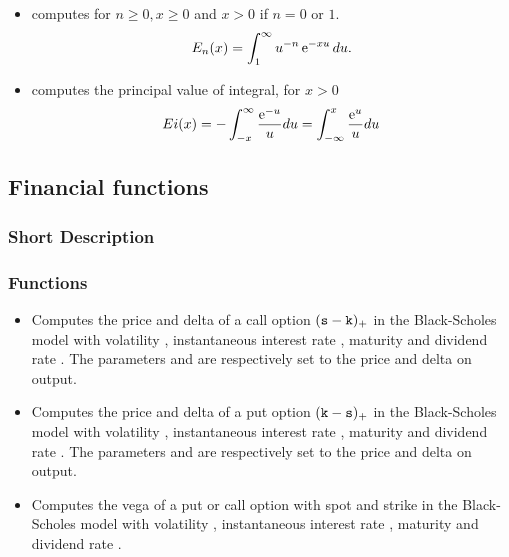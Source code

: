 \begin{itemize}
\item {}
  \sshortdescribe   computes for  $ n\geq 0, x \geq 0$ and $x>0$ if $n=0$ or $1$.
  \begin{equation*}
    E_n(x)= \int_1^{\infty} u^{-n} \operatorname{e}^{ -x u } du.
  \end{equation*}
\item {}
  \sshortdescribe   computes the principal value of integral, for $x>0$ 
  \begin{equation*}
    Ei(x) = - \int_{-x}^{\infty} \frac{\operatorname{e}^{ -u }}{u} du = \int_{-\infty}^x \frac{\operatorname{e}^{ u }}{u} du 
  \end{equation*}
\end{itemize}




\subsection{Financial functions}
\subsubsection{Short Description}
\subsubsection{Functions}


\begin{itemize}
\item
  \sshortdescribe Computes the price and delta of a call option $({\tt s} -
  {\tt k})_+$ in the Black-Scholes model with volatility ,
  instantaneous interest rate , maturity  and dividend rate
  . The parameters  and  are respectively
  set to the price and delta on output.
\item
  \sshortdescribe Computes the price and delta of a put option $({\tt k} - 
  {\tt s})_+$ in the Black-Scholes model with volatility ,
  instantaneous interest rate , maturity  and dividend rate
  .  The parameters  and  are respectively
  set to the price and delta on output.
\item
  \sshortdescribe Computes the vega of a put or call option with spot 
  and strike  in the Black-Scholes model with volatility ,
  instantaneous interest rate , maturity  and dividend rate
  .
\end{itemize}


